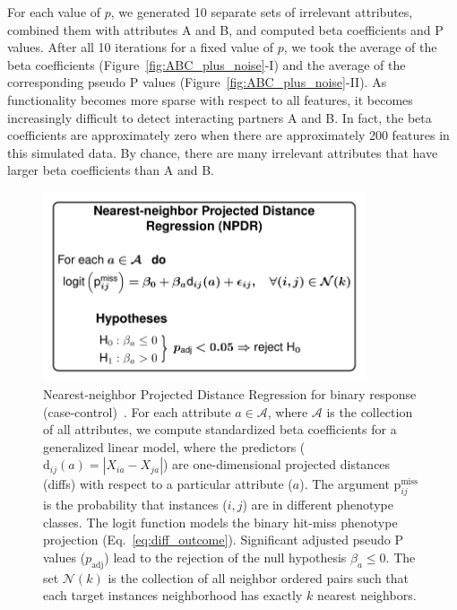 \documentclass[10pt,letterpaper]{article}
\begin{document}
For each value of $p$, we generated 10 separate sets of irrelevant attributes, combined them with attributes A and B, and computed beta coefficients and P values. After all 10 iterations for a fixed value of $p$, we took the average of the beta coefficients (Figure~\ref{fig:ABC_plus_noise}-I) and the average of the corresponding pseudo P values (Figure~\ref{fig:ABC_plus_noise}-II). As functionality becomes more sparse with respect to all features, it becomes increasingly difficult to detect interacting partners A and B. In fact, the beta coefficients are approximately zero when there are approximately 200 features in this simulated data. By chance, there are many irrelevant attributes that have larger beta coefficients than A and B. 

\begin{figure}[h!]
	\centering
	\includegraphics[width=0.85\textwidth]{npdr_finished_diagram.pdf}
	\caption{Nearest-neighbor Projected Distance Regression for binary response (case-control)~\cite{npdr2}. For each attribute $a \in \mathcal{A}$, where $\mathcal{A}$ is the collection of all attributes, we compute standardized beta coefficients for a generalized linear model, where the predictors ($\text{d}_{ij}(a) = |X_{ia} - X_{ja}|$) are one-dimensional projected distances (diffs) with respect to a particular attribute ($a$). The argument $\text{p}^\text{miss}_{ij}$ is the probability that instances ($i,j$) are in different phenotype classes. The logit function models the binary hit-miss phenotype projection (Eq.~\ref{eq:diff_outcome}). Significant adjusted pseudo P values ($p_\text{adj}$) lead to the rejection of the null hypothesis $\beta_a \leq 0$. The set $\mathcal{N}(k)$ is the collection of all neighbor ordered pairs such that each target instances neighborhood has exactly $k$ nearest neighbors.}\label{fig:npdr_finished}
\end{figure}
\end{document}
